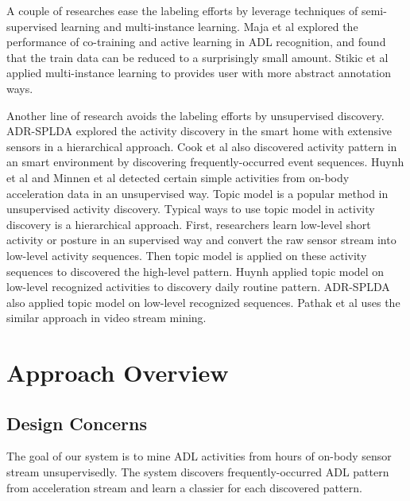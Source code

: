 \documentclass{sigchi}
\begin{document}
A couple of researches ease the labeling efforts by leverage techniques of semi-supervised learning and multi-instance learning.
Maja et al \cite{stikic2008exploring} explored the performance of co-training and active learning in ADL recognition, and found that the train data can be reduced to a surprisingly small amount.
Stikic et al \cite{stikic2009activity} applied multi-instance learning to provides user with more abstract annotation ways.

Another line of research avoids the labeling efforts by unsupervised discovery.
ADR-SPLDA \cite{chikhaoui2012adr} explored the activity discovery in the smart home with extensive sensors in a hierarchical approach. Cook et al\cite{cook2013activity} also discovered activity pattern in an smart environment by discovering frequently-occurred event sequences.
Huynh et al \cite{huynh2006unsupervised} and Minnen et al \cite{minnen2006discovering} detected certain simple activities from on-body acceleration data in an unsupervised way. Topic model is a popular method in unsupervised activity discovery.
Typical ways to use topic model in activity discovery is a hierarchical approach.
First, researchers learn low-level short activity or posture in an supervised way and convert the raw sensor stream into low-level activity sequences.
Then topic model is applied on these activity sequences to discovered the high-level pattern.
Huynh \cite{huynh2008discovery} applied topic model on low-level recognized activities to discovery daily routine pattern.
ADR-SPLDA \cite{chikhaoui2012adr} also applied topic model on low-level recognized sequences.
Pathak et al \cite{wang2009human} uses the similar approach in video stream mining.


\section{Approach Overview}
\label{sec.overview}

    \subsection{Design Concerns}
    The goal of our system is to mine ADL activities from hours of on-body sensor stream unsupervisedly.
    The system discovers frequently-occurred ADL pattern from acceleration stream and learn a classier for each discovered pattern.
\end{document}
